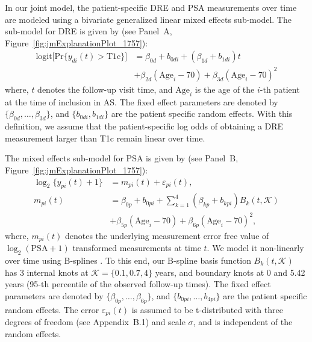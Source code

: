 In our joint model, the patient-specific DRE and PSA measurements over time are modeled using a bivariate generalized linear mixed effects sub-model. The sub-model for DRE is given by (see Panel~A, Figure~\ref{fig:jmExplanationPlot_1757}):
\begin{equation}
\label{eq:long_model_dre}
\begin{split}
    \mbox{logit} \big[\mbox{Pr}\{y_{di}(t) > \mbox{T1c}\}\big] &= \beta_{0d} + b_{0di} + (\beta_{1d} + b_{1di}) t\\
    &+ \beta_{2d} (\mbox{Age}_i-70) + \beta_{3d} (\mbox{Age}_i-70)^2
    \end{split}
\end{equation}
where, $t$ denotes the follow-up visit time, and $\mbox{Age}_i$ is the age of the ${i\mbox{-th}}$ patient at the time of inclusion in AS. The fixed effect parameters are denoted by ${\{\beta_{0d}, \ldots, \beta_{3d}\}}$, and ${\{b_{0di}, b_{1di}\}}$ are the patient specific random effects. With this definition, we assume that the patient-specific log odds of obtaining a DRE measurement larger than T1c remain linear over time. 

The mixed effects sub-model for PSA is given by (see Panel~B, Figure~\ref{fig:jmExplanationPlot_1757}):
\begin{equation}
\label{eq:long_model_psa}
\begin{split}
    \log_2 \big\{y_{pi}(t) + 1\big\} &= m_{pi}(t) + \varepsilon_{pi}(t),\\
    m_{pi}(t) &= \beta_{0p} + b_{0pi} + \sum_{k=1}^4 (\beta_{kp} + b_{kpi})  B_k(t,\mathcal{K})\\ 
    &+ \beta_{5p} (\mbox{Age}_i-70) + \beta_{6p} (\mbox{Age}_i-70)^2,
    \end{split}
\end{equation}
where, $m_{pi}(t)$ denotes the underlying measurement error free value of $\log_2 (\mbox{PSA} + 1)$ transformed \citep{pearson1994mixed,lin2000latent} measurements at time $t$. We model it non-linearly over time using B-splines \citep{de1978practical}. To this end, our B-spline basis function $B_k(t, \mathcal{K})$ has 3 internal knots at $\mathcal{K} = \{0.1, 0.7, 4\}$ years, and boundary knots at 0 and 5.42 years (95-th percentile of the observed follow-up times). The fixed effect parameters are denoted by ${\{\beta_{0p},\ldots,\beta_{6p}\}}$, and ${\{b_{0pi}, \ldots, b_{4pi}\}}$ are the patient specific random effects. The error $\varepsilon_{pi}(t)$ is assumed to be t-distributed with three degrees of freedom (see Appendix~B.1) and scale $\sigma$, and is independent of the random effects. 

